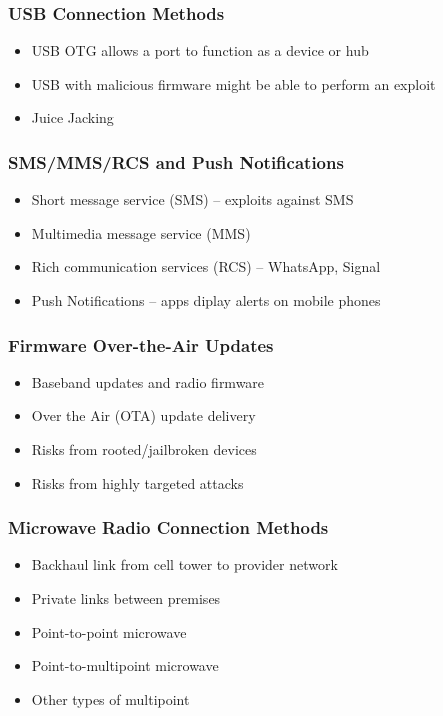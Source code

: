 		\subsubsection {USB Connection Methods}
			\begin{itemize}
				\item USB OTG allows a port to function as a device or hub
				\item USB with malicious firmware might be able to perform an exploit
				\item Juice Jacking
			\end{itemize}
		\subsubsection {SMS/MMS/RCS and Push Notifications}
			\begin{itemize}
				\item Short message service (SMS) -- exploits against SMS
				\item Multimedia message service (MMS)
				\item Rich communication services (RCS) -- WhatsApp, Signal
				\item Push Notifications -- apps diplay alerts on mobile phones
			\end{itemize}
		\subsubsection {Firmware Over-the-Air Updates}
			\begin{itemize}
				\item Baseband updates and radio firmware
				\item Over the Air (OTA) update delivery
				\item Risks from rooted/jailbroken devices
				\item Risks from highly targeted attacks
			\end{itemize}
		\subsubsection {Microwave Radio Connection Methods}
			\begin{itemize}
				\item Backhaul link from cell tower to provider network
				\item Private links between premises
				\item Point-to-point microwave
				\item Point-to-multipoint microwave
				\item Other types of multipoint
			\end{itemize}
